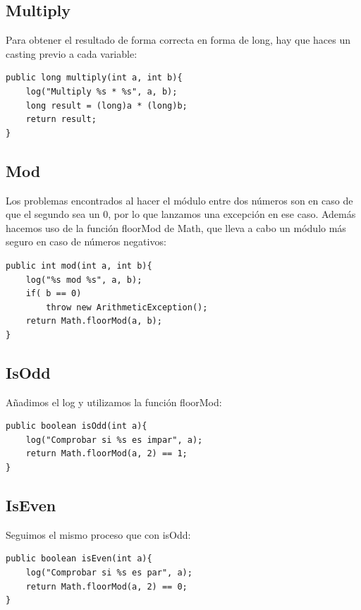 \documentclass[12pt, a4paper,twoside,titlepage]{article}
\begin{document}
\vspace{6mm}
\subsection{Multiply}

Para obtener el resultado de forma correcta en forma de long, hay que haces un casting previo a cada variable:

\begin{verbatim}
public long multiply(int a, int b){
    log("Multiply %s * %s", a, b);
    long result = (long)a * (long)b;
    return result;
}
\end{verbatim}

\vspace{6mm}
\subsection{Mod}

Los problemas encontrados al hacer el módulo entre dos números son en caso de que el segundo sea un 0, por lo que lanzamos una excepción en ese caso. Además hacemos uso de la función floorMod de Math, que lleva a cabo un módulo más seguro en caso de números negativos:

\begin{verbatim}
public int mod(int a, int b){
    log("%s mod %s", a, b);
    if( b == 0)
        throw new ArithmeticException();
    return Math.floorMod(a, b);
}
\end{verbatim}

\vspace{6mm}
\subsection{IsOdd}
Añadimos el log y utilizamos la función floorMod:
\begin{verbatim}
public boolean isOdd(int a){
    log("Comprobar si %s es impar", a);
    return Math.floorMod(a, 2) == 1;
}
\end{verbatim}

\vspace{6mm}
\subsection{IsEven}
Seguimos el mismo proceso que con isOdd:

\begin{verbatim}
public boolean isEven(int a){
    log("Comprobar si %s es par", a);
    return Math.floorMod(a, 2) == 0;
}
\end{verbatim}
\end{document}
